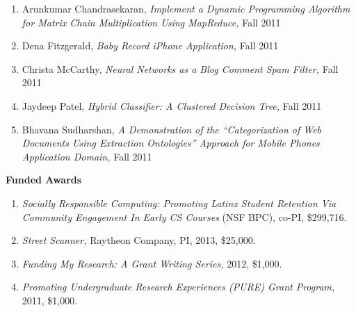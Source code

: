 \documentclass[11pt]{letter}
\begin{document}
\begin{enumerate}
\item Arunkumar Chandrasekaran, \emph{Implement a Dynamic Programming Algorithm for Matrix Chain Multiplication Using MapReduce,} Fall 2011
\item Dena Fitzgerald, \emph{Baby Record iPhone Application,} Fall 2011
\item Christa McCarthy, \emph{Neural Networks as a Blog Comment Spam Filter,} Fall 2011
\item Jaydeep Patel, \emph{Hybrid Classifier: A Clustered Decision Tree,} Fall 2011
\item Bhavana Sudharshan, \emph{A Demonstration of the ``Categorization of Web Documents Using Extraction Ontologies'' Approach for Mobile Phones Application Domain,} Fall 2011
\end{enumerate}



\textbf{Funded Awards}
\begin{enumerate}
\item \emph{Socially Responsible Computing: Promoting Latinx Student Retention Via Community Engagement In Early CS Courses} (NSF BPC), co-PI, \$299,716.
\item \emph{Street Scanner,} Raytheon Company, PI, 2013, \$25,000.
\item \emph{Funding My Research: A Grant Writing Series,} 2012, \$1,000.
\item \emph{Promoting Undergraduate Research Experiences (PURE) Grant Program,} 2011, \$1,000.
\end{enumerate}
\end{document}
